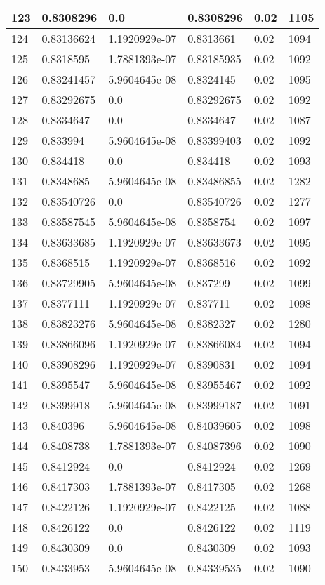 \begin{longtable}{|l|l|l|l|l|l|}
123 & 0.8308296 & 0.0 & 0.8308296 & 0.02 & 1105 \\ \hline 
124 & 0.83136624 & 1.1920929e-07 & 0.8313661 & 0.02 & 1094 \\ \hline 
125 & 0.8318595 & 1.7881393e-07 & 0.83185935 & 0.02 & 1092 \\ \hline 
126 & 0.83241457 & 5.9604645e-08 & 0.8324145 & 0.02 & 1095 \\ \hline 
127 & 0.83292675 & 0.0 & 0.83292675 & 0.02 & 1092 \\ \hline 
128 & 0.8334647 & 0.0 & 0.8334647 & 0.02 & 1087 \\ \hline 
129 & 0.833994 & 5.9604645e-08 & 0.83399403 & 0.02 & 1092 \\ \hline 
130 & 0.834418 & 0.0 & 0.834418 & 0.02 & 1093 \\ \hline 
131 & 0.8348685 & 5.9604645e-08 & 0.83486855 & 0.02 & 1282 \\ \hline 
132 & 0.83540726 & 0.0 & 0.83540726 & 0.02 & 1277 \\ \hline 
133 & 0.83587545 & 5.9604645e-08 & 0.8358754 & 0.02 & 1097 \\ \hline 
134 & 0.83633685 & 1.1920929e-07 & 0.83633673 & 0.02 & 1095 \\ \hline 
135 & 0.8368515 & 1.1920929e-07 & 0.8368516 & 0.02 & 1092 \\ \hline 
136 & 0.83729905 & 5.9604645e-08 & 0.837299 & 0.02 & 1099 \\ \hline 
137 & 0.8377111 & 1.1920929e-07 & 0.837711 & 0.02 & 1098 \\ \hline 
138 & 0.83823276 & 5.9604645e-08 & 0.8382327 & 0.02 & 1280 \\ \hline 
139 & 0.83866096 & 1.1920929e-07 & 0.83866084 & 0.02 & 1094 \\ \hline 
140 & 0.83908296 & 1.1920929e-07 & 0.8390831 & 0.02 & 1094 \\ \hline 
141 & 0.8395547 & 5.9604645e-08 & 0.83955467 & 0.02 & 1092 \\ \hline 
142 & 0.8399918 & 5.9604645e-08 & 0.83999187 & 0.02 & 1091 \\ \hline 
143 & 0.840396 & 5.9604645e-08 & 0.84039605 & 0.02 & 1098 \\ \hline 
144 & 0.8408738 & 1.7881393e-07 & 0.84087396 & 0.02 & 1090 \\ \hline 
145 & 0.8412924 & 0.0 & 0.8412924 & 0.02 & 1269 \\ \hline 
146 & 0.8417303 & 1.7881393e-07 & 0.8417305 & 0.02 & 1268 \\ \hline 
147 & 0.8422126 & 1.1920929e-07 & 0.8422125 & 0.02 & 1088 \\ \hline 
148 & 0.8426122 & 0.0 & 0.8426122 & 0.02 & 1119 \\ \hline 
149 & 0.8430309 & 0.0 & 0.8430309 & 0.02 & 1093 \\ \hline 
150 & 0.8433953 & 5.9604645e-08 & 0.84339535 & 0.02 & 1090 \\ \hline 
\end{longtable}